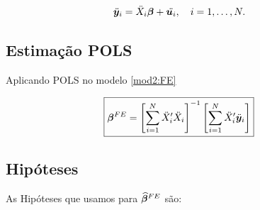 \documentclass[11pt, oneside, a4paper, article]{article}
\numberwithin{equation}{section}
\begin{document}
\vspace{-1 em}
\begin{align} \label{mod2:FE}
\ddot{\boldsymbol{y}}_{i} &= \ddot{X}_{i} \boldsymbol{\beta} + \ddot{\boldsymbol{u}_{i}},
\quad i = 1, \dots, N.
\end{align}

\subsection*{Estimação POLS}

Aplicando POLS no modelo \eqref{mod2:FE}

\vspace{-1 em}
\begin{align} \label{beta:pols:FE}
\Aboxed{
\mbs{\beta}^{FE} =
\left[ \sum_{i=1}^{N} \ddot{X}_{i}' \ddot{X}_{i} \right]^{-1}
\left[ \sum_{i=1}^{N} \ddot{X}_{i}' \ddot{\mbs{y}}_{i} \right]
}
\end{align}

\subsection*{Hipóteses}

As Hipóteses que usamos para $\boldsymbol{\widehat{\beta}}^{FE}$ são:
\end{document}
